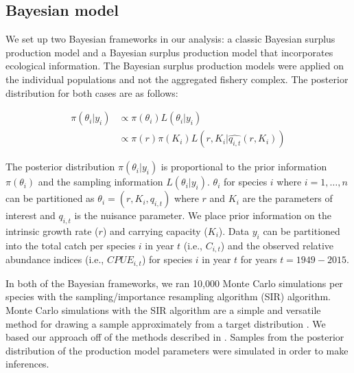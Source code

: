 \documentclass[oneside,12pt,final]{sty/ucthesis-CA2012}
\let\cite\citep                             %
\begin{document}
\begin{mainmatter}
\subsection*{Bayesian model}
We set up two Bayesian frameworks in our analysis: a classic Bayesian surplus production model and a Bayesian surplus production model that incorporates ecological information. The Bayesian surplus production models were applied on the individual populations and not the aggregated fishery complex. The posterior distribution for both cases are as follows:
 
\begin{align*}
\pi(\theta_i|y_i) & \propto \pi(\theta_i)L(\theta_i|y_i) \\
& \propto \pi(r)\pi(K_i)L(r,K_i|\hat{q_{i,t}}(r,K_i))
\end{align*}

The posterior distribution $\pi(\theta_i|y_i)$ is proportional to the prior information $\pi(\theta_i)$ and the sampling information $L(\theta_i|y_i)$. $\theta_i$ for species $i$ where $i=1,\dots,n$ can be partitioned as $\theta_i=(r,K_i,q_{i,t})$ where $r$ and $K_i$ are the parameters of interest and $q_{i,t}$ is the nuisance parameter. We place prior information on the intrinsic growth rate ($r$) and carrying capacity ($K_i$). Data $y_i$ can be partitioned into the total catch per species $i$ in year $t$ (i.e., $C_{i,t}$) and the observed relative abundance indices (i.e., $CPUE_{i,t}$) for species $i$ in year $t$ for years $t=1949-2015$. 

\vspace{5mm}

In both of the Bayesian frameworks, we ran 10,000 Monte Carlo simulations per species with the sampling/importance resampling algorithm (SIR) algorithm. Monte Carlo simulations with the SIR algorithm are a simple and versatile method for drawing a sample approximately from a target distribution \cite{mcallister1997bayesian, givens2012computational}. We based our approach off of the methods described in \citet{mcallister1997bayesian}. Samples from the posterior distribution of the production model parameters were simulated in order to make inferences.


\end{mainmatter}
\end{document}
